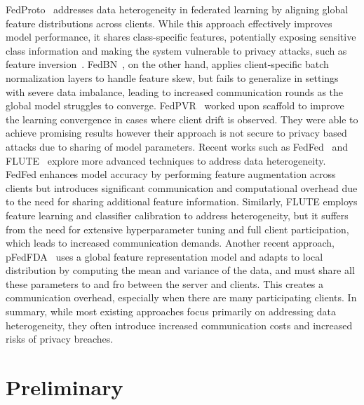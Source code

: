 \documentclass[lettersize,journal]{IEEEtran}
\begin{document}
FedProto~\cite{tan2022federated} addresses data heterogeneity in federated learning by aligning global feature distributions across clients. While this approach effectively improves model performance, it shares class-specific features, potentially exposing sensitive class information and making the system vulnerable to privacy attacks, such as feature inversion~\cite{wang2019beyond}. FedBN~\cite{li2021fedbn}, on the other hand, applies client-specific batch normalization layers to handle feature skew, but fails to generalize in settings with severe data imbalance, leading to increased communication rounds as the global model struggles to converge. FedPVR~\cite{Li_2023_CVPR} worked upon scaffold to improve the learning convergence in cases where client drift is observed. They were able to achieve promising results however their approach is not secure to privacy based attacks due to sharing of model parameters. Recent works such as FedFed~\cite{yang2023fedfed} and FLUTE~\cite{liu2024federated} explore more advanced techniques to address data heterogeneity. FedFed enhances model accuracy by performing feature augmentation across clients but introduces significant communication and computational overhead due to the need for sharing additional feature information. Similarly, FLUTE employs feature learning and classifier calibration to address heterogeneity, but it suffers from the need for extensive hyperparameter tuning and full client participation, which leads to increased communication demands. Another recent approach, pFedFDA~\cite{mclaughlin2024personalized} uses a global feature representation model and adapts to local distribution by computing the mean and variance of the data, and must share all these parameters to and fro between the server and clients. This creates a communication overhead, especially when there are many participating clients. 
In summary, while most existing approaches focus primarily on addressing data heterogeneity, they often introduce increased communication costs and increased risks of privacy breaches. 

\section{Preliminary}
\label{sec:preli}
\end{document}
